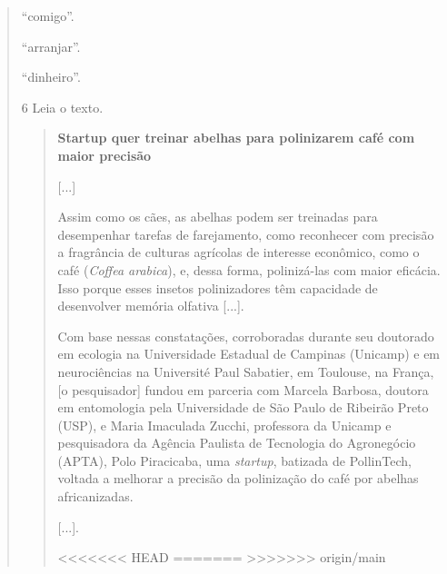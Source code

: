 \begin{quote}
\begin{escolha}
\item “comigo”.

\item “arranjar”.

\item “dinheiro”.
\end{escolha}


\num{6} Leia o texto.

\begin{quote}
\textbf{Startup quer treinar abelhas para polinizarem café com maior precisão}

{[}...{]}

Assim como os cães, as abelhas podem ser treinadas para desempenhar
tarefas de farejamento, como reconhecer com precisão a fragrância de
culturas agrícolas de interesse econômico, como o café (\textit{Coffea arabica}),
e, dessa forma, polinizá-las com maior eficácia. Isso porque esses
insetos polinizadores têm capacidade de desenvolver memória olfativa
{[}...{]}.

Com base nessas constatações, corroboradas durante seu doutorado em
ecologia na Universidade Estadual de Campinas (Unicamp) e em
neurociências na Université Paul Sabatier, em Toulouse, na França,
[o pesquisador] fundou em parceria com Marcela Barbosa, doutora em entomologia
pela Universidade de São Paulo de Ribeirão Preto (USP), e Maria
Imaculada Zucchi, professora da Unicamp e pesquisadora da Agência
Paulista de Tecnologia do Agronegócio (APTA), Polo Piracicaba, uma
\textit{startup}, batizada de PollinTech, voltada a melhorar a precisão da
polinização do café por abelhas africanizadas.

{[}...{]}.

<<<<<<< HEAD
=======
>>>>>>> origin/main
\end{quote}


\end{quote}
